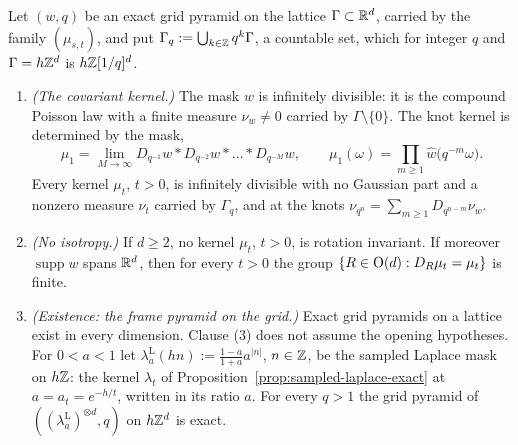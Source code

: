 \begin{proposition}
\label{prop:grid-pyramid-not-isotropic}
\leanok
{}
Let $(w, q)$ be an exact grid pyramid on the lattice $\Gamma \subset \mathbb{R}^d$, carried by the family
$(\mu_{s,t})$, and put $\Gamma_q := \bigcup_{k \in \mathbb{Z}}q^k\Gamma$, a countable set, which for
integer $q$ and $\Gamma = h\mathbb{Z}^d$ is $h\mathbb{Z}[1/q]^d$.
\begin{enumerate}
\item \emph{(The covariant kernel.)} The mask $w$ is infinitely divisible: it is the compound
Poisson law with a finite \Levy{} measure $\nu_w \ne 0$ carried by $\Gamma \setminus \{0\}$. The
knot kernel is determined by the mask,
\begin{equation}\label{eq:knot-product}
\mu_1 = \lim_{M \to \infty} D_{q^{-1}}w * D_{q^{-2}}w * \dots * D_{q^{-M}}w, \qquad
\widehat{\mu_1}(\omega) = \prod_{m \ge 1}\widehat{w}\bigl(q^{-m}\omega\bigr).
\end{equation}
Every kernel $\mu_t$, $t > 0$, is infinitely divisible with no Gaussian part and a nonzero \Levy{}
measure $\nu_t$ carried by $\Gamma_q$, and at the knots
$\nu_{q^n} = \sum_{m \ge 1} D_{q^{n-m}}\nu_w$.
\item \emph{(No isotropy.)} If $d \ge 2$, no kernel $\mu_t$, $t > 0$, is rotation invariant. If
moreover $\operatorname{supp} w$ spans $\mathbb{R}^d$, then for every $t > 0$ the group
$\{R \in \mathrm{O}(d) : D_R\mu_t = \mu_t\}$ is finite.
\item \emph{(Existence: the frame \Matern{} pyramid on the grid.)} Exact grid pyramids on a lattice exist in every dimension. Clause (3) does not assume the opening hypotheses. For $0 < a < 1$ let $\lambda^{\mathrm L}_a(hn) := \tfrac{1-a}{1+a}a^{|n|}$, $n \in \mathbb{Z}$,
be the sampled Laplace mask on $h\mathbb{Z}$: the kernel $\lambda_t$ of
Proposition~\ref{prop:sampled-laplace-exact} at $a = a_t = e^{-h/t}$, written in its ratio $a$. For
every $q > 1$ the grid pyramid of $((\lambda^{\mathrm L}_a)^{\otimes d}, q)$ on $h\mathbb{Z}^d$ is exact.

\end{enumerate}
\end{proposition}
